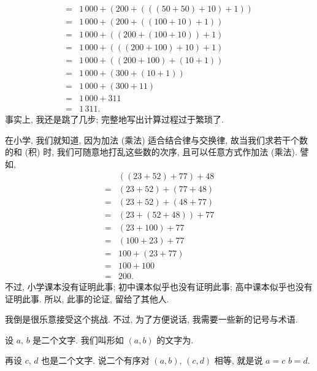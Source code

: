 \documentclass[%
    UTF8,%
    fontset=none,%
    punct=kaiming,%
    zihao=-4,%
    a4paper,%
    oneside,%
]{ctexbook}
\let\emph\relax
\begin{document}
\begin{example}
\begin{align*}
        = {} & 1\,000 + (200 + (((50 + 50) + 10) + 1))        \\
        = {} & 1\,000 + (200 + ((100 + 10) + 1))              \\
        = {} & 1\,000 + ((200 + (100 + 10)) + 1)              \\
        = {} & 1\,000 + (((200 + 100) + 10) + 1)              \\
        = {} & 1\,000 + ((200 + 100) + (10 + 1))              \\
        = {} & 1\,000 + (300 + (10 + 1))                      \\
        = {} & 1\,000 + (300 + 11)                            \\
        = {} & 1\,000 + 311                                   \\
        = {} & 1\,311.
    \end{align*}
    事实上, 我还是跳了几步;
    完整地写出计算过程过于繁琐了.
\end{example}

在小学, 我们就知道, 因为加法 (乘法)
适合结合律与交换律,
故当我们求若干个数的和 (积) 时,
我们可随意地打乱这些数的次序,
且可以任意方式作加法 (乘法).
譬如,
\begin{align*}
         & ((23 + 52) + 77) + 48 \\
    = {} & (23 + 52) + (77 + 48) \\
    = {} & (23 + 52) + (48 + 77) \\
    = {} & (23 + (52 + 48)) + 77 \\
    = {} & (23 + 100) + 77       \\
    = {} & (100 + 23) + 77       \\
    = {} & 100 + (23 + 77)       \\
    = {} & 100 + 100             \\
    = {} & 200.
\end{align*}
不过, 小学课本没有证明此事;
初中课本似乎也没有证明此事;
高中课本似乎也没有证明此事.
所以, 此事的论证, 留给了其他人.

我倒是很乐意接受这个挑战.
不过, 为了方便说话, 我需要一些新的记号与术语.

\begin{definition}
    设 \(a\), \(b\) 是二个文字.
    我们叫形如 \((a, b)\) 的文字为\emph{有序对}.

    再设 \(c\), \(d\) 也是二个文字.
    说二个有序对 \((a, b)\), \((c, d)\) 相等,
    就是说 \(a = c\) \emph{且} \(b = d\).
\end{definition}
\end{document}
